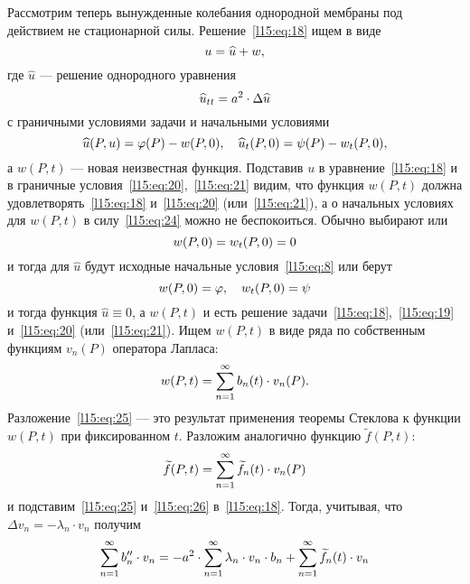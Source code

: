 Рассмотрим теперь вынужденные колебания однородной мембраны под действием не стационарной силы. Решение~\eqref{l15:eq:18} ищем в виде
\begin{equation*}
	\hfill u=\widehat{u}+w,\hfill
\end{equation*}
где $\widehat{u}$ --- решение однородного уравнения
\begin{equation*}
	\hfill \widehat{u}_{tt}=a^2\cdot\Delta\widehat{u}\hfill
\end{equation*}
с граничными условиями задачи и начальными условиями 
\begin{equation}\label{l15:eq:24}
	\hfill\widehat{u}(P,u)=\phi(P)-w(P,0),\quad \widehat{u}_t(P,0)=\psi(P)-w_t(P,0),\hfill
\end{equation}
а $w(P,t)$ --- новая неизвестная функция. Подставив $u$ в уравнение~\eqref{l15:eq:18} и в граничные условия~\eqref{l15:eq:20},~\eqref{l15:eq:21} видим, что функция $w(P,t)$ должна удовлетворять~\eqref{l15:eq:18} и~\eqref{l15:eq:20} (или~\eqref{l15:eq:21}), а о начальных условиях для $w(P,t)$ в силу~\eqref{l15:eq:24} можно не беспокоиться. Обычно выбирают или
\begin{equation*}
	\hfill w(P,0)=w_t(P,0)=0\hfill
\end{equation*} 
и тогда для $\widehat{u}$ будут исходные начальные условия~\eqref{l15:eq:8} или берут 
\begin{equation*}
	\hfill w(P,0)=\phi,\quad w_t(P,0)=\psi\hfill
\end{equation*} 
и тогда функция $\widehat{u}\equiv0$, а $w(P,t)$ и есть решение задачи~\eqref{l15:eq:18},~\eqref{l15:eq:19} и~\eqref{l15:eq:20} (или~\eqref{l15:eq:21}). Ищем $w(P,t)$ в виде ряда по собственным функциям $v_n(P)$ оператора Лапласа:
\begin{equation}\label{l15:eq:25}
	\hfill w(P,t)=\sum\limits_{n=1}^{\infty}b_n(t)\cdot v_n(P).\hfill
\end{equation}
Разложение~\eqref{l15:eq:25} --- это результат применения теоремы Стеклова к функции $w(P,t)$ при фиксированном $t$. Разложим аналогично функцию $\widetilde{f}(P,t)$:
\begin{equation}\label{l15:eq:26}
	\hfill\widetilde{f}(P,t)=\sum\limits_{n=1}^{\infty}\widetilde{f}_n(t)\cdot v_n(P)\hfill
\end{equation}
и подставим~\eqref{l15:eq:25} и~\eqref{l15:eq:26} в~\eqref{l15:eq:18}. Тогда, учитывая, что $\Delta v_n=-\lambda_n\cdot v_n$ получим 
\begin{equation*}
	\hfill\sum\limits_{n=1}^{\infty}b_n''\cdot v_n=-a^2\cdot\sum\limits_{n=1}^{\infty}\lambda_n\cdot v_n\cdot b_n+\sum\limits_{n=1}^{\infty}\widetilde{f}_n(t)\cdot v_n\hfill
\end{equation*}
